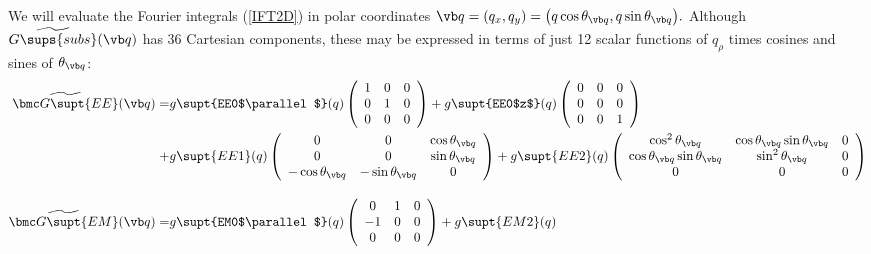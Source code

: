 \documentclass[letterpaper]{article}
\renewcommand{\wt}{\widetilde}
\begin{document}
We will evaluate the Fourier integrals (\ref{IFT2D})
in polar coordinates 
$\vb q=(q_x,q_y)=\big(q \cos\theta_{\vb q}, q\sin\theta_{\vb q}\big).$
Although $\wt{G\sups{subs}}(\vb q)$ has 36 Cartesian components,
these may be expressed in terms of just 12 scalar functions
of $q_\rho$ times cosines and sines of $\theta_{\vb q}$:
\begin{align*}
 \wt{\bmc G\supt{EE}}(\vb q)
 = &g\supt{EE0$\parallel$}(q)
    \left(\begin{array}{ccc}
    1 & 0 & 0 \\ 
    0 & 1 & 0 \\ 
    0 & 0 & 0 \\ 
   \end{array}\right)
  + g\supt{EE0$z$}(q)
    \left(\begin{array}{ccc}
    0 & 0 & 0 \\ 
    0 & 0 & 0 \\ 
    0 & 0 & 1 \\ 
   \end{array}\right)
\\
 + &g\supt{EE1}(q)
   \left(\begin{array}{ccc}
    0                     & 0                   & \cos\theta_{\vb q} \\
    0                     & 0                   & \sin\theta_{\vb q} \\
    -\cos\theta_{\vb q}   & -\sin\theta_{\vb q} & 0 
   \end{array}\right)
  +g\supt{EE2}(q)
   \left(\begin{array}{ccc}
    \cos^2\theta_{\vb q}  & \cos\theta_{\vb q} \sin\theta_{\vb q} & 0 \\
    \cos\theta_{\vb q} \sin\theta_{\vb q} & \sin^2\theta_{\vb q}  & 0 \\
    0                     & 0                    & 0 
   \end{array}\right)
\\[10pt]
 \wt{\bmc G\supt{EM}}(\vb q)
 = &g\supt{EM0$\parallel$}(q)
    \left(\begin{array}{ccc}
    0 & 1 & 0 \\ 
   -1 & 0 & 0 \\ 
    0 & 0 & 0 \\ 
   \end{array}\right)
  +g\supt{EM2}(q)

\end{align*}
\end{document}
